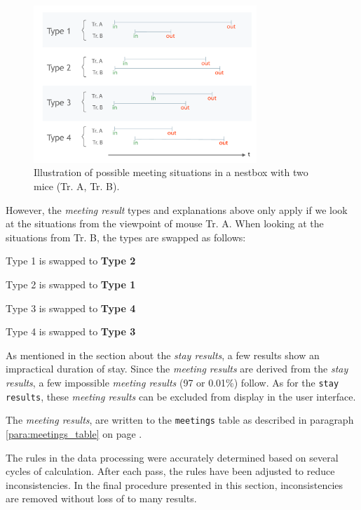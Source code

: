 \begin{figure}[pbth]
\begin{center}
  \includegraphics[width=0.75\textwidth]{assets/pdf/meeting_types_schema.pdf}
  \caption[illustration of meeting result types]{Illustration of possible meeting situations in a nestbox with two mice (Tr. A, Tr. B).}
  \label{fig:meeting_types}
\end{center}
\end{figure}

\pagebreak

However, the \textit{meeting result} types and explanations above only apply if we look at the situations from the viewpoint of mouse Tr. A. When looking at the situations from Tr. B, the types are swapped as follows:

\begin{mylist}
\item Type 1 is swapped to \textbf{Type 2}   
\item Type 2 is swapped to \textbf{Type 1}
\item Type 3 is swapped to \textbf{Type 4} 
\item Type 4 is swapped to \textbf{Type 3}
\end{mylist}

As mentioned in the section about the \textit{stay results}, a few results show an impractical duration of stay. Since the \textit{meeting results} are derived from the \textit{stay results}, a few impossible \textit{meeting results} (97 or 0.01\%) follow. As for the \lstinline|stay results|, these \textit{meeting results} can be excluded from display in the user interface.

The \textit{meeting results}, are written to the \lstinline|meetings| table as described in paragraph \ref{para:meetings_table} on page \pageref{para:meetings_table}. 

The rules in the data processing were accurately determined based on several cycles of calculation. After each pass, the rules have been adjusted to reduce inconsistencies. In the final procedure presented in this section, inconsistencies are removed without loss of to many results.
